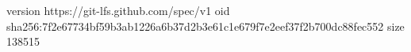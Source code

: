 version https://git-lfs.github.com/spec/v1
oid sha256:7f2e67734bf59b3ab1226a6b37d2b3e61c1e679f7e2eef37f2b700dc88fec552
size 138515

